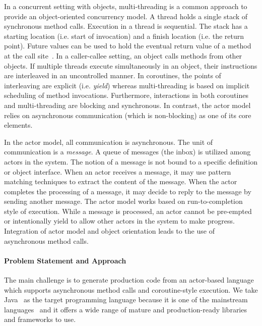 In a concurrent setting with objects, multi-threading is a common approach to provide an object-oriented concurrency model.
A thread holds a single stack of synchronous method calls.
Execution in a thread is sequential.
The stack has a starting location (i.e. start of invocation) and a finish location (i.e. the return point).
Future values can be used to hold the eventual return value of a method at the call site~\cite{DBLP:books/daglib/0092230,de2007complete}.
In a caller-callee setting, an object calls methods from other objects.
If multiple threads execute simultaneously in an object, their instructions are
interleaved in an uncontrolled manner.
In coroutines, the points of interleaving are explicit (i.e. \emph{yield}) 
whereas multi-threading is based on implicit scheduling of method invocations.
Furthermore, interactions in both coroutines and multi-threading are blocking and synchronous.
In contrast, the actor model relies on asynchronous communication (which is non-blocking)
as one of its core elements.

In the actor model, all communication is asynchronous.
The unit of communication is a \emph{message}.
A queue of messages (the inbox) is utilized among actors in the system.
The notion of a message is not bound to a specific definition or object interface.
When an actor receives a message, it may use pattern matching techniques to extract the content of the message.
When the actor completes the processing of a message, it may decide to reply to the message by sending another message.
The actor model works based on run-to-completion style of execution.
While a message is processed, an actor cannot be pre-empted or intentionally yield to allow other actors in the system to make progress.
Integration of actor model and object orientation leads to the use of asynchronous method calls.

\paragraph*{Problem Statement and Approach}
The main challenge is to generate production code from an actor-based language which supports asynchronous method calls and coroutine-style execution.
We take Java~\cite{gosling2000java} as the target programming language because it is one of the mainstream languages~\cite{tiobe} and it offers a wide range of mature and production-ready libraries and frameworks to use. 


